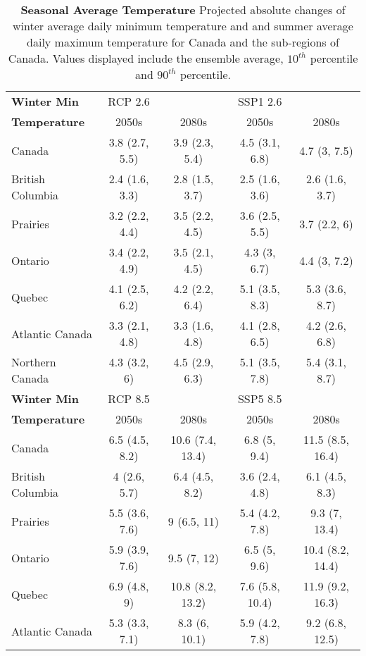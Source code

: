 \documentclass[]{scrartcl}
\begin{document}
\begin{appendices}
\begin{table}[t]
	\caption{\textbf{Seasonal Average Temperature} Projected absolute changes of winter average daily minimum temperature and and summer average daily maximum temperature for Canada and the sub-regions of Canada. Values displayed include the ensemble average, $10^{th}$ percentile and $90^{th}$ percentile.}\label{table:bc_seas_tas}
	\begin{center}
		\begin{tabularx}{\linewidth}{|L|cc|cc|} 
			\hline
			\textbf{Winter Min} & RCP 2.6 & & SSP1 2.6 &   \\
			\textbf{Temperature}                & 2050s & 2080s & 2050s &2080s \\
			\hline
			Canada & 3.8 (2.7, 5.5) & 3.9 (2.3, 5.4) & 4.5 (3.1, 6.8) & 4.7 (3, 7.5) \\ 
			British Columbia & 2.4 (1.6, 3.3) & 2.8 (1.5, 3.7) & 2.5 (1.6, 3.6) & 2.6 (1.6, 3.7) \\ 
			Prairies & 3.2 (2.2, 4.4) & 3.5 (2.2, 4.5) & 3.6 (2.5, 5.5) & 3.7 (2.2, 6) \\ 
			Ontario & 3.4 (2.2, 4.9) & 3.5 (2.1, 4.5) & 4.3 (3, 6.7) & 4.4 (3, 7.2) \\ 
			Quebec & 4.1 (2.5, 6.2) & 4.2 (2.2, 6.4) & 5.1 (3.5, 8.3) & 5.3 (3.6, 8.7) \\ 
			Atlantic Canada & 3.3 (2.1, 4.8) & 3.3 (1.6, 4.8) & 4.1 (2.8, 6.5) & 4.2 (2.6, 6.8) \\ 
			Northern Canada & 4.3 (3.2, 6) & 4.5 (2.9, 6.3) & 5.1 (3.5, 7.8) & 5.4 (3.1, 8.7) \\ 		
			\hline
			\textbf{Winter Min} & RCP 8.5 & & SSP5 8.5 &   \\
			\textbf{Temperature} & 2050s & 2080s & 2050s &2080s \\
			\hline
			Canada & 6.5 (4.5, 8.2) & 10.6 (7.4, 13.4) & 6.8 (5, 9.4) & 11.5 (8.5, 16.4) \\ 
			British Columbia & 4 (2.6, 5.7) & 6.4 (4.5, 8.2) & 3.6 (2.4, 4.8) & 6.1 (4.5, 8.3) \\ 
			Prairies & 5.5 (3.6, 7.6) & 9 (6.5, 11) & 5.4 (4.2, 7.8) & 9.3 (7, 13.4) \\ 
			Ontario & 5.9 (3.9, 7.6) & 9.5 (7, 12) & 6.5 (5, 9.6) & 10.4 (8.2, 14.4) \\ 
			Quebec & 6.9 (4.8, 9) & 10.8 (8.2, 13.2) & 7.6 (5.8, 10.4) & 11.9 (9.2, 16.3) \\ 
			Atlantic Canada & 5.3 (3.3, 7.1) & 8.3 (6, 10.1) & 5.9 (4.2, 7.8) & 9.2 (6.8, 12.5) \\ 

\end{tabularx}
\end{center}
\end{table}
\end{appendices}
\end{document}
